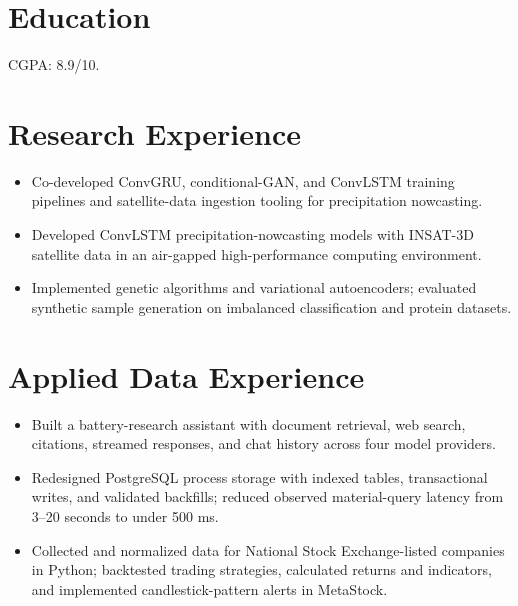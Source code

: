 

\resumeheader
\section{Education}
\vspace{3pt}
CGPA: 8.9/10.
\section{Research Experience}
\begin{itemize}
  \item Co-developed ConvGRU, conditional-GAN, and ConvLSTM training pipelines and satellite-data ingestion tooling for precipitation nowcasting.
\end{itemize}
\begin{itemize}
  \item Developed ConvLSTM precipitation-nowcasting models with INSAT-3D satellite data in an air-gapped high-performance computing environment.
\end{itemize}
\begin{itemize}
  \item Implemented genetic algorithms and variational autoencoders; evaluated synthetic sample generation on imbalanced classification and protein datasets.
\end{itemize}
\section{Applied Data Experience}
\begin{itemize}
  \item Built a battery-research assistant with document retrieval, web search, citations, streamed responses, and chat history across four model providers.
  \item Redesigned PostgreSQL process storage with indexed tables, transactional writes, and validated backfills; reduced observed material-query latency from 3--20 seconds to under 500 ms.
\end{itemize}
\begin{itemize}
  \item Collected and normalized data for National Stock Exchange-listed companies in Python; backtested trading strategies, calculated returns and indicators, and implemented candlestick-pattern alerts in MetaStock.
\end{itemize}
